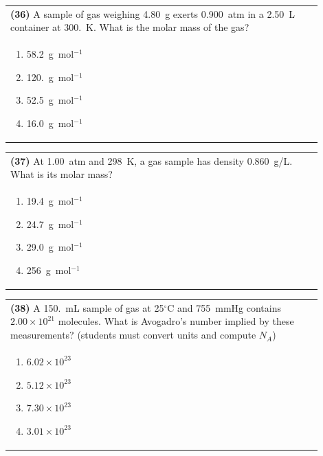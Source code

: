 \documentclass{article}
\begin{document}
{{\vspace{0.2cm}
\noindent\begin{tabular}{|p{0.9\linewidth}|}
\hline
\textbf{(36)} A sample of gas weighing 4.80~g exerts 0.900~atm in a 2.50~L container at 300.~K. What is the molar mass of the gas? \\[0.2cm]

\begin{minipage}[t]{0.85\linewidth}
\begin{enumerate}[label=\alph*.]
\item 58.2~g~mol$^{-1}$
\item 120.~g~mol$^{-1}$
\item 52.5~g~mol$^{-1}$
\item 16.0~g~mol$^{-1}$
\end{enumerate}
\end{minipage}\\[0.2cm]
\hline
\end{tabular}

\newpage

\noindent\begin{tabular}{|p{0.9\linewidth}|}
\hline
\textbf{(37)} At 1.00~atm and 298~K, a gas sample has density 0.860~g/L. What is its molar mass?\\[0.2cm]

\begin{minipage}[t]{0.85\linewidth}
\begin{enumerate}[label=\alph*.]
\item 19.4~g~mol$^{-1}$
\item 24.7~g~mol$^{-1}$
\item 29.0~g~mol$^{-1}$
\item 256~g~mol$^{-1}$
\end{enumerate}
\end{minipage}\\[0.2cm]
\hline
\end{tabular}

\vspace{0.2cm}
\noindent\begin{tabular}{|p{0.9\linewidth}|}
\hline
\textbf{(38)} A 150.~mL sample of gas at 25$^\circ$C and 755~mmHg contains $2.00\times10^{21}$ molecules. What is Avogadro's number implied by these measurements? (students must convert units and compute $N_A$)\\[0.2cm]

\begin{minipage}[t]{0.85\linewidth}
\begin{enumerate}[label=\alph*.]
\item $6.02\times10^{23}$
\item $5.12\times10^{23}$
\item $7.30\times10^{23}$
\item $3.01\times10^{23}$
\end{enumerate}
\end{minipage}\\[0.2cm]
\hline
\end{tabular}

}}
\end{document}
